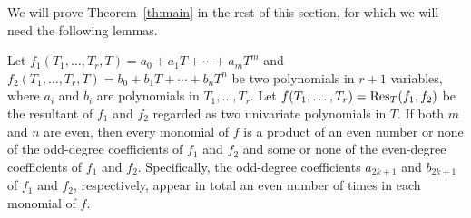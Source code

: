 We will prove Theorem~\ref{th:main} in the rest of this section, for
which we will need the following lemmas.
%
\begin{lemma}
  \label{th:resultant}
  Let $f_1(T_1,\ldots,T_r,T)=a_0 + a_1T + \cdots + a_mT^m$ and
  $f_2(T_1,\ldots,T_r,T)=b_0 + b_1T + \cdots + b_nT^n$ be two
  polynomials in $r+1$ variables, where $a_i$ and $b_i$ are
  polynomials in $T_1,\ldots,T_r$.
  Let $f(T_1,\ldots,T_r)=\operatorname{Res}_T(f_1,f_2)$ be the resultant of $f_1$
  and $f_2$ regarded as two univariate polynomials in $T$.
  If both $m$ and $n$ are even, then every monomial of $f$ is a
  product of an even number or none of the odd-degree coefficients of
  $f_1$ and $f_2$ and some or none of the even-degree coefficients of
  $f_1$ and $f_2$.
  Specifically, the odd-degree coefficients $a_{2k+1}$ and $b_{2k+1}$
  of $f_1$ and $f_2$, respectively, appear in total an even number of
  times in each monomial of $f$.
\end{lemma}
%
